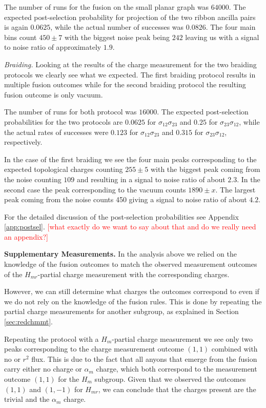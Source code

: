 \documentclass[two column]{article}
\newcommand{\caro}[1]{\textcolor{red}{[#1]}}
\begin{document}
The number of runs for the fusion on the small planar graph was $64000$. The expected post-selection probability for projection of the two ribbon ancilla pairs is again $0.0625$, while the actual number of successes was $0.0826$. The four main bins count $450\pm7$ with the biggest noise peak being $242$ leaving us with a signal to noise ratio of approximately $1.9$.

\emph{Braiding.}
Looking at the results of the charge measurement for the two braiding protocols we clearly see what we expected. The first braiding protocol results in multiple fusion outcomes while for the second braiding protocol the resulting fusion outcome is only vacuum.


The number of runs for both protocol was $16000$. The expected post-selection probabilities for the two protocols are $0.0625$ for $\sigma_{12}\sigma_{23}$ and $0.25$ for $\sigma_{23}\sigma_{12}$, while the actual rates of successes were $0.123$ for $\sigma_{12}\sigma_{23}$ and $0.315$ for $\sigma_{23}\sigma_{12}$, respectively.

In the case of the first braiding we see the four main peaks corresponding to the expected topological charges counting $255\pm 5$ with the biggest peak coming from the noise counting $109$ and resulting in a signal to noise ratio of about $2.3$. In the second case the peak corresponding to the vacuum counts $1890\pm x$. The largest peak coming from the noise counts 450 giving a signal to noise ratio of about $4.2$.

For the detailed discussion of the post-selection probabilities see Appendix \ref{app:postsel}.
\caro{what exactly do we want to say about that and do we really need an appendix?}


\textbf{Supplementary Measurements.} In the analysis above we relied on the knowledge of the fusion outcomes to match the observed measurement outcomes of the $H_{mr}$-partial charge measurement with the corresponding charges. 

However, we can still determine what charges the outcomes correspond to even if we do not rely on the knowledge of the fusion rules. This is done by repeating the partial charge measurements for another subgroup, as explained in Section \ref{sec:redchmmt}.

Repeating the protocol with a $H_m$-partial charge measurement we see only two peaks corresponding to the charge measurement outcome $(1,1)$ combined with no or $r^2$ flux. This is due to the fact that all anyons that emerge from the fusion carry either no charge or $\alpha_m$ charge, which both correspond to the measurement outcome $(1,1)$ for the $H_m$ subgroup. Given that we observed the outcomes $(1,1)$ and $(1,-1)$ for $H_{mr}$, we can conclude that the charges present are the trivial and the $\alpha_m$ charge.
\end{document}
